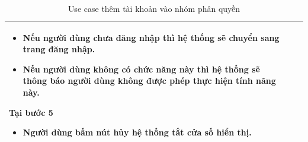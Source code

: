 \documentclass[12pt,a4paper]{article}
\begin{document}
\begin{table}[H]
\begin{tabular}{|p{3.5cm}|p{11.5cm}|c|}
\begin{itemize}
                              \item Nếu người dùng chưa đăng nhập thì hệ thống sẽ chuyển sang trang đăng nhập.
                              \item Nếu người dùng không có chức năng này thì hệ thống sẽ thông báo người dùng không được phép thực hiện tính năng này.
            \end{itemize}
            Tại bước 5\newline
            \vspace{-.8cm}\begin{itemize}
                              \item Người dùng bấm nút hủy hệ thống tắt cửa số hiển thị.
            \end{itemize}

            \\ \hline
        \end{tabular}
        \caption{Use case thêm tài khoản vào nhóm phân quyền }
    \end{table}


\end{document}

